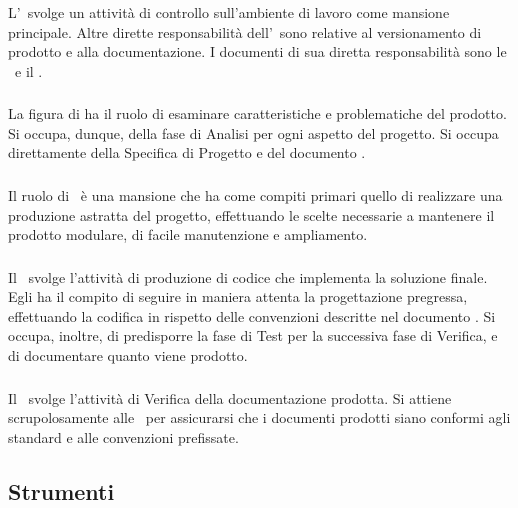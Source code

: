 		\subsubsection{\Amm}
		L'\Amm\ svolge un attività di controllo sull'ambiente di lavoro come mansione principale. Altre dirette responsabilità dell'\Amm\ sono relative al versionamento di prodotto e alla documentazione. I documenti di sua diretta responsabilità sono le \NdP\ e il \PdP.
		
		\subsubsection{\Ana}
		La figura di \Ana ha il ruolo di esaminare caratteristiche e problematiche del prodotto. Si occupa, dunque, della fase di Analisi per ogni aspetto del progetto. Si occupa direttamente della Specifica di Progetto e del documento \AdR.

		\subsubsection{\Prog}
		Il ruolo di \Prog\ è una mansione che ha come compiti primari quello di realizzare una produzione astratta del progetto, effettuando le scelte necessarie a mantenere il prodotto modulare, di facile manutenzione e ampliamento.
		
		\subsubsection{\Progr}
		Il \Progr\ svolge l'attività di produzione di codice che implementa la soluzione finale. Egli ha il compito di seguire in maniera attenta la progettazione pregressa, effettuando la codifica in rispetto delle convenzioni descritte nel documento \NdP. Si occupa, inoltre, di predisporre la fase di Test per la successiva fase di Verifica, e di documentare quanto viene prodotto.
		
		\subsubsection{\Ver}
		Il \Ver\ svolge l'attività di Verifica della documentazione prodotta. Si attiene scrupolosamente alle \NdP\ per assicurarsi che i documenti prodotti siano conformi agli standard e alle convenzioni prefissate.

	\subsection{Strumenti}

